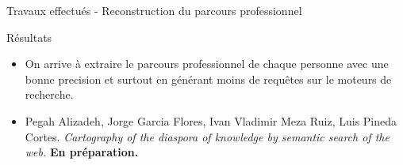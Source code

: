 \documentclass{beamer}
\begin{document}
{{\begin{frame}{Travaux effectués - Reconstruction du parcours professionnel}
\begin{block}{Résultats}
\begin{itemize}
\item On arrive à extraire le parcours professionnel de chaque personne avec une bonne precision et surtout en générant moins de requêtes sur le moteurs de recherche.  
\end{itemize}
\end{block}

\begin{itemize}
\small
\item  Pegah Alizadeh, Jorge Garcia Flores, Ivan Vladimir Meza Ruiz, Luis Pineda Cortes.
\textit{Cartography of the diaspora of knowledge by semantic search of the web.} \textbf{En préparation.}
\end{itemize}

\end{frame}


%


}}
\end{document}
